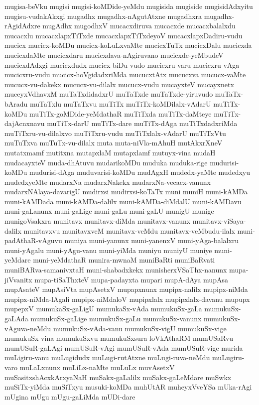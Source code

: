 {mugisa-beVku
mugisi
mugisi-koMDide-yeMdu
mugisida
mugiside
mugisidAdxyitu
mugisu-vudakAkxgi
mugadhx
mugadhx-nAgutAtxne
mugadhxra
mugadhx-rAgidAdxre
mugAdhx
mugodhxV
mucacxdiruva
mucacxde
mucacxbalalxdu
mucacxlu
mucacxlapxTiTxde
mucacxlapxTiTxdeyoV
mucacxlapxDadiru-vudu
mucicx
mucicx-koMDu
mucicx-koLuLxvaMte
mucicxTuTx
mucicxDalu
mucicxda
mucicxdaMte
mucicxdaru
mucicxdava-nAgiruvano
mucicxde-yeMbudeV
mucicxdAdxgi
mucicxdudx
mucicx-biDu-vudo
mucicxru-varu
mucicxru-vAga
mucicxru-vudu
mucicx-hoVgidadxriMda
mucucxtAtx
mucucxva
mucucx-vaMte
mucucx-vu-dakekx
mucucx-vu-dilalx
mucucx-vudu
mucayxteV
mucayxnetx
muceyxVdhavxM
muTaTxdidadxrU
muTaTxde
muTaTxde-yiruvudo
muTaTx-bAradu
muTaTxlu
muTaTxvu
muTiTx
muTiTx-koMDilalx-vAdarU
muTiTx-koMDu
muTiTx-goMDide-yeMdathaR
muTiTxda
muTiTx-daMteye
muTiTx-dajAcnxnavu
muTiTx-darU
muTiTx-dare
muTiTx-dAga
muTiTxdadxriMda
muTiTxru-vu-dilalxvo
muTiTxru-vudu
muTiTxlalx-vAdarU
muTiTxVtu
muTuTxva
muTuTx-vu-dilalx
muta
muta-niVla-mAhuH
mutAkxrXneV
mutatxmamf
mutitxna
mutapxlaM
mutapxlamf
mutuyx-vina
mudaH
mudacayxteV
muda-dhAtuvu
mudarikoMDu
muduka
muduka-rige
mudurisi-koMDu
mudurisi-dAga
muduvarisi-koMDu
mudAgxH
mudedx-yaMte
mudedxyu
mudedxyeMte
mudarxNa
mudarxNakekx
mudarxNa-vecacx-vanunx
mudarxNAlaya-davarigU
mudirxsi
mudirxsi-koTaTx
muni
muniH
muni-kAMDa
muni-kAMDada
muni-kAMDa-dalilx
muni-kAMDa-diMdalU
muni-kAMDavu
muni-gaLanunx
muni-gaLige
muni-gaLu
muni-gaLU
munigU
munige
munigoVsakxra
munitavx
munitavx-diMda
munitavx-vanunx
munitavx-viSaya-dalilx
munitavxvu
munitavxveM
munitavx-veMdu
munitavx-veMbudu-ilalx
muni-padAthaR-vAguvu
muniya
muni-yanunx
muni-yanenxV
muni-yAga-balalxru
muni-yAgalu
muni-yAgu-vanu
muni-yiMda
muniyu
muniyU
muniye
muni-yeMdare
muni-yeMdathaR
munira-mwnaM
muniBaRti
muniBaRvati
muniBARva-samanivxtaH
muni-shabadxkekx
munisherxVSaThx-nanunx
mupa-jiVvanitx
mupa-tiSaThxteV
mupa-padayxta
mupari
mupA-dAya
mupAsa
mupAsateV
mupAsiVta
mupAsetxV
mupapxnunx
mupipx-nalilx
mupipx-niMda
mupipx-niMda-lAgali
mupipx-niMdaloV
mupipxlalx
mupipxlalx-davanu
mupupx
mupepxV
mumukaSx-gaLigU
mumukaSx-vAda
mumukuSx-gaLa
mumukuSx-gaLAda
mumukuSx-gaLige
mumukuSx-gaLu
mumukuSx-vanunx
mumukuSx-vAguva-neMdu
mumukuSx-vAda-vanu
mumukuSx-vigU
mumukuSx-vige
mumukuSx-vina
mumukuSxvu
mumukuSxsura-loVkAthaRM
mumUSaRvu
mumUSuR-gaLAgi
mumUSuR-vAgi
mumUSuR-vAda
mumUSuR-vige
murida
muLigiru-vanu
muLugidudx
muLugi-rutAtxne
muLugi-ruva-neMdu
muLugiru-varo
muLaLxnunx
muLiLx-naMte
muLuLx
muvAsetxV
muSasitxshAcxkArxyaNaH
muSakx-gaLalilx
muSakx-gaLeMdare
muSwkx
muSiTx-yiMda
muSiTxyu
musuki-koMDa
muhUtAR
muheyxVveYSa
mUka-rAgi
mUgina
mUgu
mUgu-gaLiMda
mUDi-dare
}
